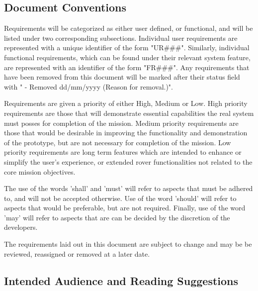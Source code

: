 \documentclass{article}
\begin{document}
\subsection{Document Conventions}
\begin{adjustwidth}{1em}{0pt}
Requirements will be categorized as either user defined, or functional, and will be listed under two corresponding subsections. Individual user requirements are represented with a unique identifier of the form "UR\#\#\#". Similarly, individual functional requirements, which can be found under their relevant system feature, are represented with an identifier of the form "FR\#\#\#". Any requirements that have been removed from this document will be marked after their status field with " - Removed dd/mm/yyyy (Reason for removal.)". 

Requirements are given a priority of either High, Medium or Low. High priority requirements are those that will demonstrate essential capabilities the real system must posses for completion of the mission. Medium priority requirements are those that would be desirable in improving the functionality and demonstration of the prototype, but are not necessary for completion of the mission. Low priority requirements are long term features which are intended to enhance or simplify the user's experience, or extended rover functionalities not related to the core mission objectives. 

The use of the words 'shall' and 'must' will refer to aspects that must be adhered to, and will not be accepted otherwise. Use of the word 'should' will refer to aspects that would be preferable, but are not required. Finally, use of the word 'may' will refer to aspects that are can be decided by the discretion of the developers.  

The requirements laid out in this document are subject to change and may be be reviewed, reassigned or removed at a later date.
\end{adjustwidth}

\subsection{Intended Audience and Reading Suggestions}
\end{document}

